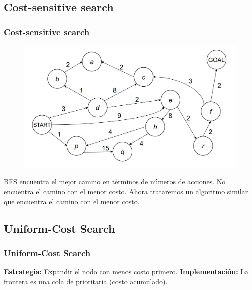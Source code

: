 \documentclass[10pt]{beamer}
\begin{document}
\subsection{Cost-sensitive search}

\begin{frame}
  \frametitle{Cost-sensitive search}

  \begin{figure}[!h] 
    \centering
    \includegraphics[width=1\textwidth]{img/ucs1}
  \end{figure} 

  BFS encuentra el mejor camino en términos de números de acciones.
  No encuentra el camino con el menor costo. Ahora trataremos 
  un algoritmo similar que encuentra el camino con el menor costo.
  
\end{frame}
\subsection{Uniform-Cost Search}

\begin{frame}
  \frametitle{Uniform-Cost Search}

  \textbf{Estrategia:} Expandir el nodo con menos \alert{costo} primero.
  \textbf{Implementación:} La frontera es una \alert{cola de prioritaria} (costo acumulado).

\end{frame}
\end{document}
